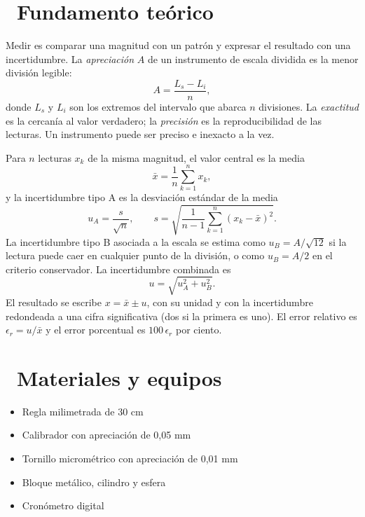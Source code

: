 \documentclass[11pt,a4paper]{article}
\newcommand{\iconotexto}[2]{\textcolor{cyanNeon}{\faIcon{#1}}~#2}
\begin{document}
\section{\iconotexto{book-open}{Fundamento teórico}}

Medir es comparar una magnitud con un patrón y expresar el resultado con
una incertidumbre. La \emph{apreciación} $A$ de un instrumento de escala
dividida es la menor división legible:
\[
  A = \frac{L_s - L_i}{n},
\]
donde $L_s$ y $L_i$ son los extremos del intervalo que abarca $n$
divisiones. La \emph{exactitud} es la cercanía al valor verdadero; la
\emph{precisión} es la reproducibilidad de las lecturas. Un instrumento
puede ser preciso e inexacto a la vez.

Para $n$ lecturas $x_k$ de la misma magnitud, el valor central es la media
\[
  \bar{x} = \frac{1}{n}\sum_{k=1}^{n} x_k,
\]
y la incertidumbre tipo A es la desviación estándar de la media
\[
  u_A = \frac{s}{\sqrt{n}}, \qquad
  s = \sqrt{\frac{1}{n-1}\sum_{k=1}^{n}\left(x_k-\bar{x}\right)^2}.
\]
La incertidumbre tipo B asociada a la escala se estima como
$u_B = A/\sqrt{12}$ si la lectura puede caer en cualquier punto de la
división, o como $u_B = A/2$ en el criterio conservador. La incertidumbre
combinada es
\[
  u = \sqrt{u_A^2 + u_B^2}.
\]
El resultado se escribe $x = \bar{x} \pm u$, con su unidad y con la
incertidumbre redondeada a una cifra significativa (dos si la primera es
uno). El error relativo es $\epsilon_r = u/\bar{x}$ y el error porcentual
es $100\,\epsilon_r$ por ciento.

\begin{center}
\par{}
\end{center}

\section{\iconotexto{box-open}{Materiales y equipos}}

\begin{itemize}[leftmargin=1.4em,itemsep=2pt,topsep=3pt]
  \item Regla milimetrada de 30 cm
  \item Calibrador con apreciación de 0,05 mm
  \item Tornillo micrométrico con apreciación de 0,01 mm
  \item Bloque metálico, cilindro y esfera
  \item Cronómetro digital
\end{itemize}
\end{document}
